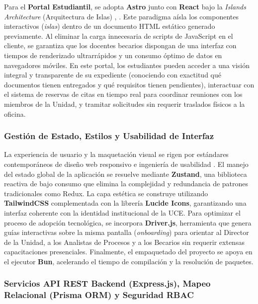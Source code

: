 Para el \textbf{Portal Estudiantil}, se adopta \textbf{Astro} junto con \textbf{React} bajo la \textit{Islands Architecture} (Arquitectura de Islas) \cite{astro_docs}, \cite{banks_react}. Este paradigma aísla los componentes interactivos (\textit{islas}) dentro de un documento HTML estático generado previamente. Al eliminar la carga innecesaria de scripts de JavaScript en el cliente, se garantiza que los docentes becarios dispongan de una interfaz con tiempos de renderizado ultrarrápidos y un consumo óptimo de datos en navegadores móviles. En este portal, los estudiantes pueden acceder a una visión integral y transparente de su expediente (conociendo con exactitud qué documentos tienen entregados y qué requisitos tienen pendientes), interactuar con el sistema de reservas de citas en tiempo real para coordinar reuniones con los miembros de la Unidad, y tramitar solicitudes sin requerir traslados físicos a la oficina.

\subsubsection{Gestión de Estado, Estilos y Usabilidad de Interfaz}

La experiencia de usuario y la maquetación visual se rigen por estándares contemporáneos de diseño web responsivo e ingeniería de usabilidad \cite{nielsen_usability}. El manejo del estado global de la aplicación se resuelve mediante \textbf{Zustand}, una biblioteca reactiva de bajo consumo que elimina la complejidad y redundancia de patrones tradicionales como Redux. La capa estética se construye utilizando \textbf{TailwindCSS} \cite{tailwind_docs} complementada con la librería \textbf{Lucide Icons}, garantizando una interfaz coherente con la identidad institucional de la UCE. Para optimizar el proceso de adopción tecnológica, se incorpora \textbf{Driver.js}, herramienta que genera guías interactivas sobre la misma pantalla (\textit{onboarding}) para orientar al Director de la Unidad, a los Analistas de Procesos y a los Becarios sin requerir extensas capacitaciones presenciales. Finalmente, el empaquetado del proyecto se apoya en el ejecutor \textbf{Bun}, acelerando el tiempo de compilación y la resolución de paquetes.

\subsubsection{Servicios API REST Backend (Express.js), Mapeo Relacional (Prisma ORM) y Seguridad RBAC}

